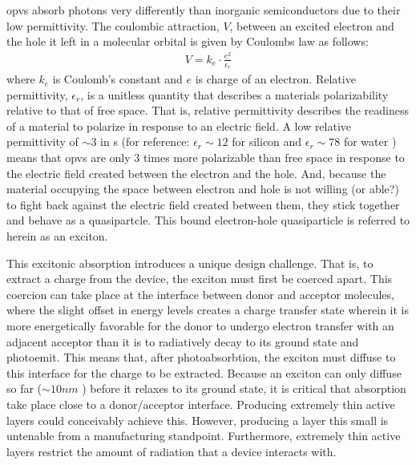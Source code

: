 \gls{opv}s absorb photons very differently than inorganic semiconductors due to their low
permittivity. 
The coulombic attraction, $V$, between an excited
electron and the hole it left in a molecular orbital
is given by Coulombs law as follows:
\begin{align}
    \label{coulomb}
    V  = k_{e} \cdot \frac{e^{2}}{\epsilon_{r}}
\end{align}
where $k_{e}$ is Coulomb's constant and $e$ is charge of an electron.
Relative permittivity, $\epsilon_{r}$, is a unitless quantity that describes a materials polarizability relative to that of free space.
That is, relative
permittivity describes the readiness of a material
to polarize in response to an electric field. 
A low
relative permittivity of ${\sim}3$ in s (for reference: $\epsilon_{r}{\sim}12$ for silicon
\cite{Baroni1986} and $\epsilon_{r}{\sim}78$ for water \cite{George2004})
means that \gls{opv}s are only $3$ times more polarizable than free space in response to the electric field
created between the electron and the hole. 
And, because the material occupying the space between electron and hole %
is not willing (or able?) to fight back against the electric field created between them, they stick together and behave as a quasipartcle. 
This bound electron-hole quasiparticle is referred to herein as an exciton.

This excitonic absorption introduces a unique design challenge.
That is, to extract a charge from the device, the exciton
must first be coerced apart.
This coercion can take place at the interface between donor and acceptor molecules,
where the slight offset in energy levels creates a charge transfer state wherein it is more
energetically favorable for the donor to undergo electron transfer with an adjacent acceptor than
it is to radiatively decay to its ground state and photoemit.
This means that, after photoabsorbtion, the exciton must diffuse to this interface for the charge to be
extracted.
Because an exciton can only diffuse so far (${\sim}10nm$ \cite{clarke2010}) before it relaxes to
its ground state, it is critical that absorption take place close to a donor/acceptor
interface. 
Producing extremely thin active layers could conceivably achieve this.
However,
producing a layer this small is untenable from a manufacturing standpoint.
Furthermore, extremely thin active
layers restrict the amount of radiation that a device interacts with. 

